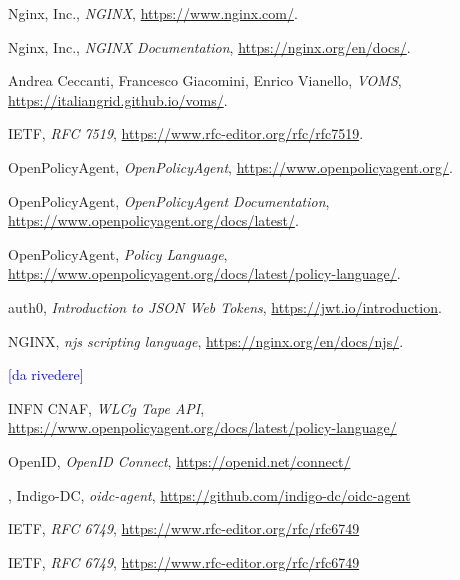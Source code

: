 \begin{thebibliography}{99}

	Nginx, Inc.,
	\textit{NGINX},
	\url{https://www.nginx.com/}.

	Nginx, Inc.,
	\textit{NGINX Documentation},
	\url{https://nginx.org/en/docs/}.

	Andrea Ceccanti, Francesco Giacomini, Enrico Vianello,
	\textit{VOMS},
	\url{https://italiangrid.github.io/voms/}.

	IETF,
	\textit{RFC 7519},
	\url{https://www.rfc-editor.org/rfc/rfc7519}.

	OpenPolicyAgent,
	\textit{OpenPolicyAgent},
	\url{https://www.openpolicyagent.org/}.

	OpenPolicyAgent,
	\textit{OpenPolicyAgent Documentation},
	\url{https://www.openpolicyagent.org/docs/latest/}.

	OpenPolicyAgent,
	\textit{Policy Language},
	\url{https://www.openpolicyagent.org/docs/latest/policy-language/}.

	auth0, \textit{Introduction to JSON Web Tokens},
	\url{https://jwt.io/introduction}. 

	NGINX,
	\textit{njs scripting language},
	\url{https://nginx.org/en/docs/njs/}.

	\textcolor{blue}{[da rivedere]}
    
	INFN CNAF,
	\textit{WLCg Tape API},
	\url{https://www.openpolicyagent.org/docs/latest/policy-language/}

	OpenID, 
	\textit{OpenID Connect},
	\url{https://openid.net/connect/}

	, 
	Indigo-DC, \textit{oidc-agent}, 
	\url{https://github.com/indigo-dc/oidc-agent}

	IETF, 
	\textit{RFC 6749},
	\url{https://www.rfc-editor.org/rfc/rfc6749}

	IETF, 
	\textit{RFC 6749},
	\url{https://www.rfc-editor.org/rfc/rfc6749}

\end{thebibliography}